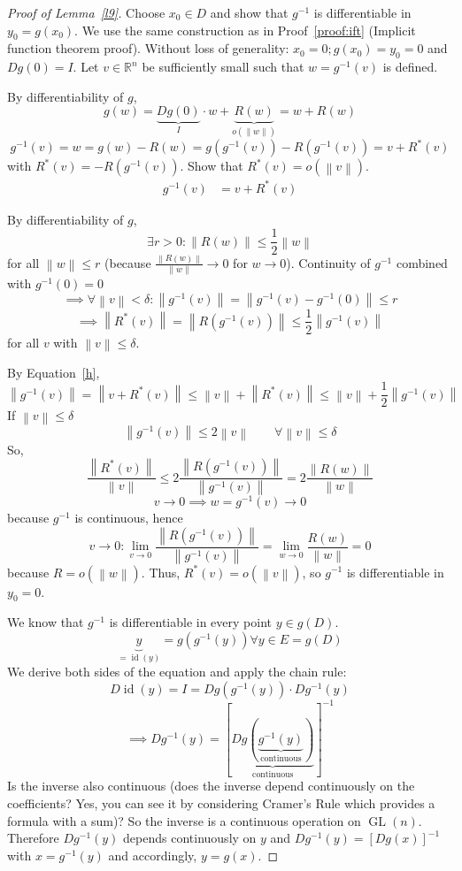 \documentclass{article}
\newcommand{\norm}[1]{\left\|#1\right\|}
\begin{document}
\begin{proof}[Proof of Lemma~\ref{l9}]
  \label{proof:f9}
  Choose $x_0 \in D$ and show that $g^{-1}$ is differentiable in $y_0 = g(x_0)$.
  We use the same construction as in Proof~\ref{proof:ift} (Implicit function theorem proof).
  Without loss of generality: $x_0 = 0; g(x_0) = y_0 = 0$ and $Dg(0) = I$.
  Let $v \in \mathbb R^n$ be sufficiently small such that $w = g^{-1}(v)$ is defined.

  By differentiability of $g$,
  \[ g(w) = \underbrace{Dg(0)}_{I} \cdot w + \underbrace{R(w)}_{o(\norm{w})} = w + R(w) \]
  \[ g^{-1}(v) = w = g(w) - R(w) = g(g^{-1}(v)) - R(g^{-1}(v)) = v + R^{*}(v) \]
  with $R^{*}(v) = -R(g^{-1}(v))$. Show that $R^*(v) = o(\norm{v})$.
  \begin{align}
    g^{-1}(v) &= v + R^{*}(v)  \label{h}
  \end{align}

  By differentiability of $g$,
  \[ \exists r > 0: \norm{R(w)} \leq \frac12 \norm{w} \]
  for all $\norm{w} \leq r$ (because $\frac{\norm{R(w)}}{\norm{w}} \to 0$ for $w \to 0$).
  Continuity of $g^{-1}$ combined with $g^{-1}(0) = 0$
  \[ \implies \forall \norm{v} < \delta: \norm{g^{-1}(v)} = \norm{g^{-1}(v) - g^{-1}(0)} \leq r \]
  \[ \implies \norm{R^*(v)} = \norm{R(g^{-1}(v))} \leq \frac12 \norm{g^{-1}(v)} \]
  for all $v$ with $\norm{v} \leq \delta$.

  By Equation~\eqref{h},
  \[ \norm{g^{-1}(v)} = \norm{v + R^*(v)} \leq \norm v + \norm{R^*(v)} \leq \norm v + \frac12 \norm{g^{-1}(v)} \]
  If $\norm v \leq \delta$
  \[ \norm{g^{-1}(v)} \leq 2 \norm v \qquad \forall \norm v \leq \delta \]
  So,
  \[ \frac{\norm{R^*(v)}}{\norm{v}} \leq 2 \frac{\norm{R(g^{-1}(v))}}{\norm{g^{-1}(v)}} = 2 \frac{\norm{R(w)}}{\norm{w}} \]
  \[ v \to 0 \implies w = g^{-1}(v) \to 0 \]
  because $g^{-1}$ is continuous, hence
  \[ v \to 0: \lim_{v \to 0} \frac{\norm{R(g^{-1}(v))}}{\norm{g^{-1}(v)}} = \lim_{w \to 0} \frac{R(w)}{\norm{w}} = 0 \]
  because $R = o(\norm{w})$. Thus, $R^*(v) = o(\norm v)$, so $g^{-1}$ is differentiable in $y_0 = 0$.

  We know that $g^{-1}$ is differentiable in every point $y \in g(D)$.
  \[ \underbrace{y}_{= \operatorname{id}(y)} = g(g^{-1}(y)) \forall y \in E = g(D) \]
  We derive both sides of the equation and apply the chain rule:
  \[ D\operatorname{id}(y) = I = Dg(g^{-1}(y)) \cdot Dg^{-1}(y) \]
  \[ \implies Dg^{-1}(y) = [\underbrace{Dg(\underbrace{g^{-1}(y)}_{\text{continuous}} )}_{\text{continuous}}]^{-1} \]
  Is the inverse also continuous (does the inverse depend continuously on the coefficients? Yes, you can see it by considering Cramer's Rule which provides a formula with a sum)? So the inverse is a continuous operation on $\operatorname{GL}(n)$.
  Therefore $Dg^{-1}(y)$ depends continuously on $y$ and $Dg^{-1}(y) = [Dg(x)]^{-1}$ with $x = g^{-1}(y)$ and accordingly, $y = g(x)$.
\end{proof}
\end{document}
